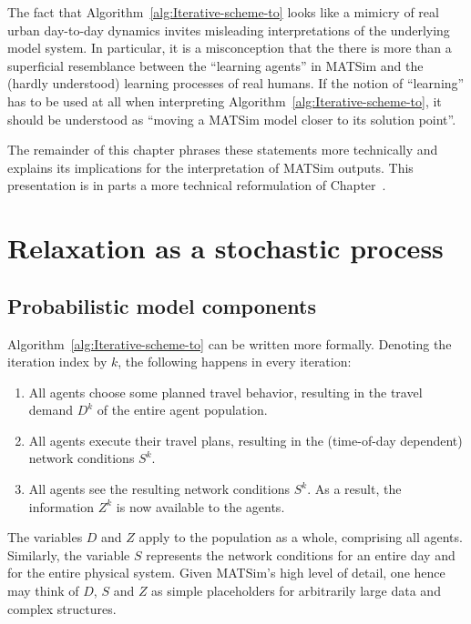 The fact that Algorithm~\ref{alg:Iterative-scheme-to} looks like
a mimicry of real urban day-to-day dynamics invites misleading interpretations
of the underlying model system. In particular, it is a misconception
that the there is more than a superficial resemblance between the
{}``learning agents'' in MATSim and the (hardly understood) learning
processes of real humans. If the notion of {}``learning'' has to
be used at all when interpreting Algorithm~\ref{alg:Iterative-scheme-to},
it should be understood as {}``moving a MATSim model closer to its
solution point''. 

The remainder of this chapter phrases these statements more technically
and explains its implications for the interpretation of MATSim outputs.
This presentation is in parts a more technical reformulation of Chapter~.


\section{\label{sec:Relaxation-as-a}Relaxation as a stochastic process}


\subsection{\label{sub:Probabilistic-model-components}Probabilistic model components}

Algorithm~\ref{alg:Iterative-scheme-to} can be written more formally.
Denoting the iteration index by $k$, the following happens in every
iteration:
\begin{enumerate}
\item \label{enu:Every-traveler-chooses}All agents choose some planned
travel behavior, resulting in the travel demand $D^{k}$ of the entire
agent population.
\item \label{enu:All-travelers-execute}All agents execute their travel
plans, resulting in the (time-of-day dependent) network conditions
$S^{k}$.
\item \label{enu:All-travelers-observe}All agents see the resulting network
conditions $S^{k}$. As a result, the information $Z^{k}$ is now
available to the agents.
\end{enumerate}
The variables $D$ and $Z$ apply to the population as a whole, comprising
all agents. Similarly, the variable $S$ represents the network conditions
for an entire day and for the entire physical system. Given MATSim's
high level of detail, one hence may think of $D$, $S$ and $Z$ as
simple placeholders for arbitrarily large data and complex structures.

